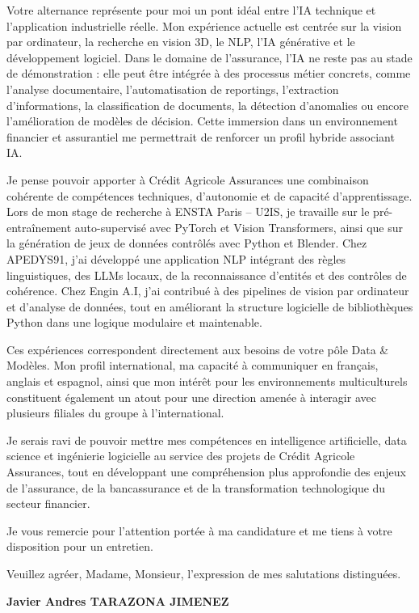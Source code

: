 \documentclass[10pt,a4paper]{article}
\begin{document}
{Votre alternance représente pour moi un pont idéal entre l’IA technique et l’application industrielle réelle. Mon expérience actuelle est centrée sur la vision par ordinateur, la recherche en vision 3D, le NLP, l’IA générative et le développement logiciel. Dans le domaine de l’assurance, l’IA ne reste pas au stade de démonstration : elle peut être intégrée à des processus métier concrets, comme l’analyse documentaire, l’automatisation de reportings, l’extraction d’informations, la classification de documents, la détection d’anomalies ou encore l’amélioration de modèles de décision. Cette immersion dans un environnement financier et assurantiel me permettrait de renforcer un profil hybride associant IA.

Je pense pouvoir apporter à Crédit Agricole Assurances une combinaison cohérente de compétences techniques, d’autonomie et de capacité d’apprentissage. Lors de mon stage de recherche à ENSTA Paris – U2IS, je travaille sur le pré-entraînement auto-supervisé avec PyTorch et Vision Transformers, ainsi que sur la génération de jeux de données contrôlés avec Python et Blender. Chez APEDYS91, j’ai développé une application NLP intégrant des règles linguistiques, des LLMs locaux, de la reconnaissance d’entités et des contrôles de cohérence. Chez Engin A.I, j’ai contribué à des pipelines de vision par ordinateur et d’analyse de données, tout en améliorant la structure logicielle de bibliothèques Python dans une logique modulaire et maintenable.

Ces expériences correspondent directement aux besoins de votre pôle Data \& Modèles. Mon profil international, ma capacité à communiquer en français, anglais et espagnol, ainsi que mon intérêt pour les environnements multiculturels constituent également un atout pour une direction amenée à interagir avec plusieurs filiales du groupe à l’international.

Je serais ravi de pouvoir mettre mes compétences en intelligence artificielle, data science et ingénierie logicielle au service des projets de Crédit Agricole Assurances, tout en développant une compréhension plus approfondie des enjeux de l’assurance, de la bancassurance et de la transformation technologique du secteur financier.

Je vous remercie pour l’attention portée à ma candidature et me tiens à votre disposition pour un entretien.


Veuillez agréer, Madame, Monsieur, l'expression de mes salutations distinguées.

\vspace{0.8cm}

\textbf{Javier Andres TARAZONA JIMENEZ}

}
\end{document}

